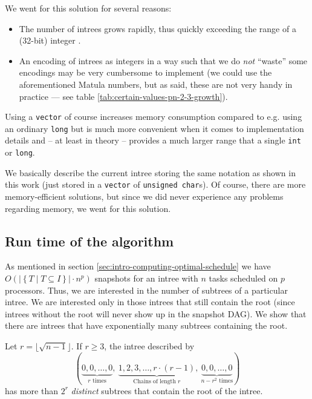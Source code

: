 We went for this solution for several reasons:

\begin{itemize}
\item The number of intrees grows rapidly, thus quickly exceeding the range of a (32-bit) integer \cite{oeisrootedtrees}.
\item An encoding of intrees as integers in a way such that we do \emph{not} ``waste'' some encodings may be very cumbersome to implement (we could use the aforementioned Matula numbers, but as said, these are not very handy in practice --- see table \ref{tab:certain-values-pn-2-3-growth}).
\end{itemize}

Using a \texttt{vector} of course increases memory consumption compared to e.g. using an ordinary \texttt{long} but is much more convenient when it comes to implementation details and -- at least in theory -- provides a much larger range that a single \texttt{int} or \texttt{long}.

We basically describe the current intree storing the same notation as shown in this work (just stored in a \texttt{vector} of \texttt{unsigned char}s). Of course, there are more memory-efficient solutions, but since we did never experience any problems regarding memory, we went for this solution.

\subsection{Run time of the algorithm}
\label{sec:implementation-computing-all-schedules-runtime}

As mentioned in section \ref{sec:intro-computing-optimal-schedule} we have $O\left(|\left\{ T \mid T\subseteq I \right\}|\cdot n^p\right)$ snapshots for an intree with $n$ tasks scheduled on $p$ processors. Thus, we are interested in the number of subtrees of a particular intree. We are interested only in those intrees that still contain the root (since intrees without the root will never show up in the snapshot DAG). We show that there are intrees that have exponentially many subtrees containing the root.

\begin{theorem}
\label{thm:exponentially-many-subtrees}
Let $r=\lfloor\sqrt{n-1}\rfloor$. If $r\geq 3$, the intree described by
\begin{equation*}
  (
  \underbrace{0,0,\dots,0}_{r \text{ times}},
  \ 
  \underbrace{1,2,3,\dots, r \cdot (r-1)}_{\text{Chains of length } r},
  \ 
  \underbrace{0,0,\dots,0}_{n-r^2 \text{ times}}
  )
\end{equation*}
has more than $2^r$ \emph{distinct} subtrees that contain the root of the intree.
\end{theorem}

